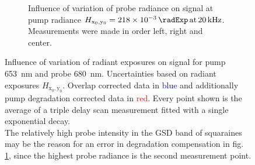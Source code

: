 \documentclass[twoside,openright,listof=numbered]{scrreprt}
\def\frep#1{\ensuremath{\,\mathrm{at}\, \SI{#1}{\kilo\hertz}}}
\def\radiantExp{\ensuremath{H_\mathrm{x_0,y_0}}}
\begin{document}
\begin{figure}[p]
\begin{subfigure}[t]{0.5\linewidth}
\caption{Influence of variation of probe radiance on signal at pump radiance $\radiantExp=\SI{218e-3}{\radExp}\frep{20}$. Measurements were made in order left, right and center.\label{fig:PowerVarProbe}}
\end{subfigure}
\caption[Influence of variation of radiant exposures on signal for pump \SI{653}{\nano\meter} and probe \SI{680}{\nano\meter}.]{Influence of variation of radiant exposures on signal for pump \SI{653}{\nano\meter} and probe \SI{680}{\nano\meter}. Uncertainties based on radiant exposures $\radiantExp$.
Overlap corrected data in \textcolor{blue}{blue} and additionally pump degradation corrected data in \textcolor{red}{red}. Every point shown is the average of a triple delay scan measurement fitted with a single exponential decay.\\ The relatively high probe intensity in the GSD band of squaraines may be the reason for an error in degradation compensation in fig. \ref{fig:PowerVarProbe}, since the highest probe radiance is the second measurement point. \label{fig:PowerVarRaw}}
\end{figure}
\end{document}
